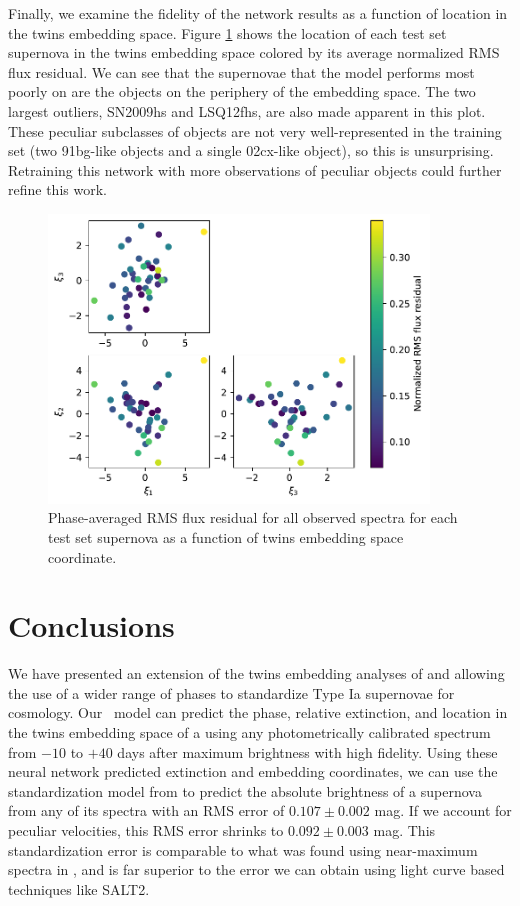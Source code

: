Finally, we examine the fidelity of the \etos{} network results as a function of location in the twins embedding space. Figure \ref{fig:e2s_embedding_resids} shows the location of each test set supernova in the twins embedding space colored by its average normalized RMS flux residual. We can see that the supernovae that the model performs most poorly on are the objects on the periphery of the embedding space. The two largest outliers, SN2009hs and LSQ12fhs, are also made apparent in this plot. These peculiar subclasses of objects are not very well-represented in the training set (two 91bg-like objects and a single 02cx-like object), so this is unsurprising. Retraining this network with more observations of peculiar objects could further refine this work.

\begin{figure}
    \centering
    \includegraphics[width=0.9\textwidth]{figures/nn_twins/embed2spec_rms_embedding.pdf}
    \caption{Phase-averaged RMS flux residual for all observed spectra for each test set supernova as a function of twins embedding space coordinate.}
    \label{fig:e2s_embedding_resids}
\end{figure}

\section{Conclusions} \label{sec:nn_twins_conclusions}
We have presented an extension of the twins embedding analyses of  and  allowing the use of a wider range of phases to standardize Type Ia supernovae for cosmology. Our \stoe~model can predict the phase, relative extinction, and location in the twins embedding space of a \sn using any photometrically calibrated spectrum from $-10$ to $+40$ days after maximum brightness with high fidelity. Using these neural network predicted extinction and embedding coordinates, we can use the standardization model from  to predict the absolute brightness of a supernova from any of its spectra with an RMS error of $0.107 \pm 0.002$ mag. If we account for peculiar velocities, this RMS error shrinks to $0.092 \pm 0.003$ mag. This standardization error is comparable to what was found using near-maximum spectra in , and is far superior to the error we can obtain using light curve based techniques like SALT2.


